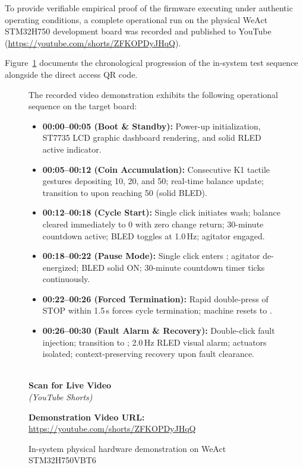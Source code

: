 To provide verifiable empirical proof of the firmware executing under authentic operating conditions, a complete operational run on the physical WeAct STM32H750 development board was recorded and published to YouTube (\url{https://youtube.com/shorts/ZFKOPDyJHqQ}).

Figure~\ref{fig:demo-video} documents the chronological progression of the in-system test sequence alongside the direct access QR code.

\begin{figure}[H]
  \centering
  \begin{minipage}[t]{0.72\linewidth}
    \vspace{0pt}
    The recorded video demonstration exhibits the following operational sequence on the target board:
    \begin{itemize}[noitemsep,topsep=2pt]
      \item \textbf{00:00--00:05 (Boot \& Standby):} Power-up initialization, ST7735 LCD graphic dashboard rendering, and solid RLED active indicator.
      \item \textbf{00:05--00:12 (Coin Accumulation):} Consecutive K1 tactile gestures depositing 10\cent, 20\cent, and 50\cent; real-time balance update; transition to  upon reaching 50\cent{} (solid BLED).
      \item \textbf{00:12--00:18 (Cycle Start):} Single click initiates wash; balance cleared immediately to 0\cent{} with zero change return; 30-minute countdown active; BLED toggles at 1.0\,Hz; agitator engaged.
      \item \textbf{00:18--00:22 (Pause Mode):} Single click enters ; agitator de-energized; BLED solid ON; 30-minute countdown timer ticks continuously.
      \item \textbf{00:22--00:26 (Forced Termination):} Rapid double-press of STOP within 1.5\,s forces cycle termination; machine resets to .
      \item \textbf{00:26--00:30 (Fault Alarm \& Recovery):} Double-click fault injection; transition to ; 2.0\,Hz RLED visual alarm; actuators isolated; context-preserving recovery upon fault clearance.
    \end{itemize}
  \end{minipage}\hfill
  \begin{minipage}[t]{0.25\linewidth}
    \vspace{0pt}
    \centering
    \\[6pt]
    \small \textbf{Scan for Live Video}\\
    \footnotesize \textit{(YouTube Shorts)}
  \end{minipage}
  \par\vspace{0.6em}
  {\centering \textbf{Demonstration Video URL:} \url{https://youtube.com/shorts/ZFKOPDyJHqQ}\par}
  \caption{In-system physical hardware demonstration on WeAct STM32H750VBT6}
  \label{fig:demo-video}
\end{figure}

